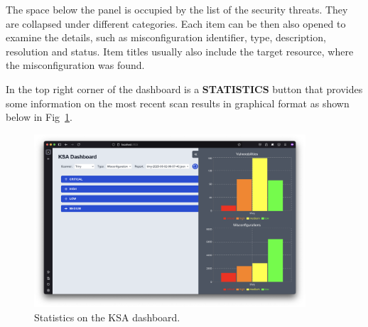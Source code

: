 The space below the panel is occupied by the list of the security threats. They are collapsed under different categories. Each item can be then also opened to examine the details, such as misconfiguration identifier, type, description, resolution and status. Item titles usually also include the target resource, where the misconfiguration was found.

In the top right corner of the dashboard is a \textbf{STATISTICS} button that provides some information on the most recent scan results in graphical format as shown below in Fig~\ref{img:ksa-dashboard-statistics}.

\begin{figure}[!hbt]
	\begin{center}
		\includegraphics[width=0.9\textwidth]{images/ksa-dashboard-statistics.png}
        \caption{Statistics on the KSA dashboard.}
		\label{img:ksa-dashboard-statistics}
	\end{center}
\end{figure}